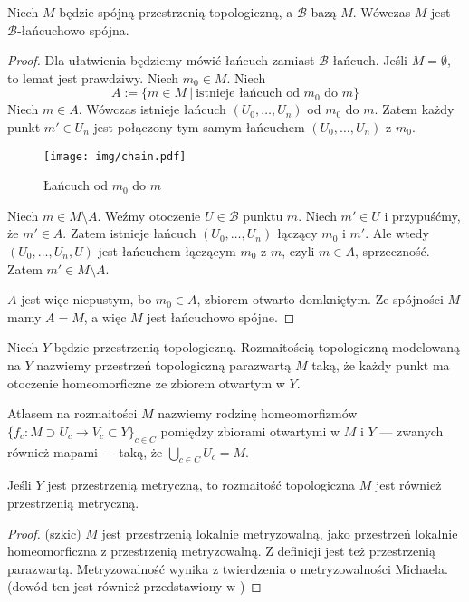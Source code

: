\begin{lem} \label{lem:chain-connected}
  Niech $M$ będzie spójną przestrzenią topologiczną, a $\mathcal B$ bazą $M$. Wówczas $M$ jest $\mathcal B$-łańcuchowo spójna.
  \begin{proof}
    Dla ułatwienia będziemy mówić łańcuch zamiast $\mathcal B$-łańcuch.
    Jeśli $M = \emptyset$, to lemat jest prawdziwy. Niech $m_0 \in M$. Niech
    \[
      A := \{m \in M\ |\ \mbox{istnieje łańcuch od $m_0$ do $m$}\}
    \]
    Niech $m \in A$.
    Wówczas istnieje łańcuch $(U_0, \ldots, U_n)$ od $m_0$ do $m$.
    Zatem każdy punkt $m' \in U_n$ jest połączony tym samym łańcuchem $(U_0, \ldots, U_n)$ z $m_0$.
    
    \begin{figure}[h!]
      \centering
      \texttt{[image: img/chain.pdf]}
      \caption{Łańcuch od $m_0$ do $m$}
    \end{figure}
    
    Niech $m \in M\setminus A$.
    Weźmy otoczenie $U\in\mathcal B$ punktu $m$. Niech $m'\in U$ i przypuśćmy, że $m'\in A$. Zatem istnieje łańcuch $(U_0, \ldots, U_n)$ łączący $m_0$ i $m'$. Ale wtedy $(U_0, \ldots, U_n, U)$ jest łańcuchem łączącym $m_0$ z $m$, czyli $m\in A$, sprzeczność. Zatem $m'\in M\setminus A$.
    
    $A$ jest więc niepustym, bo $m_0 \in A$, zbiorem otwarto-domkniętym. Ze spójności $M$ mamy $A = M$, a więc $M$ jest łańcuchowo spójne.
  \end{proof}
\end{lem}
 
\begin{df}
  Niech $Y$ będzie przestrzenią topologiczną. Rozmaitością topologiczną modelowaną na $Y$ nazwiemy przestrzeń topologiczną parazwartą $M$ taką, że każdy punkt ma otoczenie homeomorficzne ze zbiorem otwartym w $Y$.
\end{df}
 
\begin{df}
  Atlasem na rozmaitości $M$ nazwiemy rodzinę homeomorfizmów $\{f_c : M \supset U_c \to V_c \subset Y\}_{c \in C}$ pomiędzy zbiorami otwartymi w $M$ i $Y$ --- zwanych również mapami --- taką, że $\bigcup_{c \in C} U_c = M$.
\end{df}
 
\begin{fact} \label{fact:local-metrizability}
  Jeśli $Y$ jest przestrzenią metryczną, to rozmaitość topologiczna $M$ jest również przestrzenią metryczną.
  \begin{proof}(szkic)
    $M$ jest przestrzenią lokalnie metryzowalną, jako przestrzeń lokalnie homeomorficzna z przestrzenią metryzowalną. Z definicji jest też przestrzenią parazwartą. Metryzowalność wynika z twierdzenia o metryzowalności Michaela. \cite{mic} (dowód ten jest również przedstawiony w \cite{bp})
  \end{proof}
\end{fact}
 
